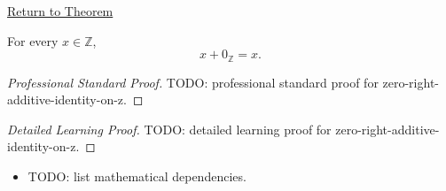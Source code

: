 \newpage
{}
\label{prf:zero-right-additive-identity-on-z}

\begin{remark*}[Return]
\hyperref[cor:zero-right-additive-identity-on-z]{Return to Theorem}
\end{remark*}

\begin{corollary*}
For every $x\in\mathbb{Z}$,
\[
x+0_{\mathbb{Z}}=x.
\]
\end{corollary*}

\begin{proof}[Professional Standard Proof]
\LRAProofBodyStart
TODO: professional standard proof for zero-right-additive-identity-on-z.
\end{proof}

\begin{proof}[Detailed Learning Proof]
\LRAProofBodyStart
TODO: detailed learning proof for zero-right-additive-identity-on-z.
\end{proof}

\begin{remark*}
\end{remark*}

\begin{dependencies}
\begin{itemize}
  \item TODO: list mathematical dependencies.
\end{itemize}
\end{dependencies}

\clearpage

